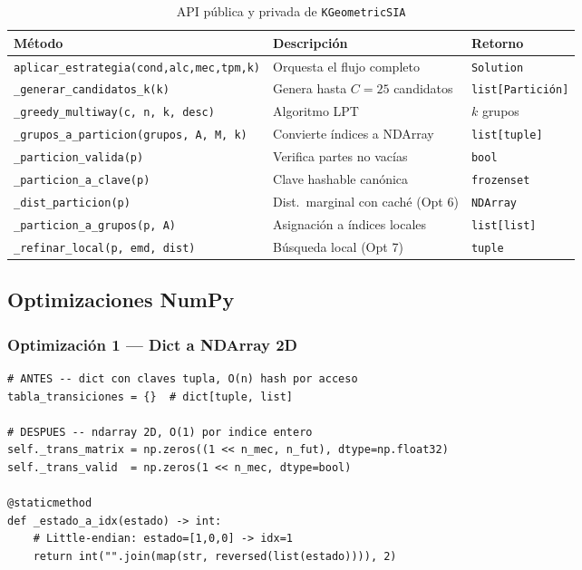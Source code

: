 \documentclass[12pt,letterpaper]{article}
\theoremstyle{definition}
\theoremstyle{remark}
\begin{document}
\begin{table}[ht]
\centering
\caption{API pública y privada de \texttt{KGeometricSIA}}
\label{tab:api-kgeomip}
\begin{tabular}{@{}l p{5.5cm} l@{}}
\toprule
\textbf{Método} & \textbf{Descripción} & \textbf{Retorno} \\
\midrule
\texttt{aplicar\_estrategia(cond,alc,mec,tpm,k)} &
  Orquesta el flujo completo & \texttt{Solution} \\
\texttt{\_generar\_candidatos\_k(k)} &
  Genera hasta $C=25$ candidatos & \texttt{list[Partición]} \\
\texttt{\_greedy\_multiway(c, n, k, desc)} &
  Algoritmo LPT & $k$ grupos \\
\texttt{\_grupos\_a\_particion(grupos, A, M, k)} &
  Convierte índices a NDArray & \texttt{list[tuple]} \\
\texttt{\_particion\_valida(p)} &
  Verifica partes no vacías & \texttt{bool} \\
\texttt{\_particion\_a\_clave(p)} &
  Clave hashable canónica & \texttt{frozenset} \\
\texttt{\_dist\_particion(p)} &
  Dist.\ marginal con caché (Opt 6) & \texttt{NDArray} \\
\texttt{\_particion\_a\_grupos(p, A)} &
  Asignación a índices locales & \texttt{list[list]} \\
\texttt{\_refinar\_local(p, emd, dist)} &
  Búsqueda local (Opt 7) & \texttt{tuple} \\
\bottomrule
\end{tabular}
\end{table}

\subsection{Optimizaciones NumPy}

\subsubsection{Optimización 1 --- Dict a NDArray 2D}

\begin{lstlisting}[style=python,
  caption={Matriz de costos: dict vs NDArray},label=lst:opt1]
# ANTES -- dict con claves tupla, O(n) hash por acceso
tabla_transiciones = {}  # dict[tuple, list]

# DESPUES -- ndarray 2D, O(1) por indice entero
self._trans_matrix = np.zeros((1 << n_mec, n_fut), dtype=np.float32)
self._trans_valid  = np.zeros(1 << n_mec, dtype=bool)

@staticmethod
def _estado_a_idx(estado) -> int:
    # Little-endian: estado=[1,0,0] -> idx=1
    return int("".join(map(str, reversed(list(estado)))), 2)
\end{lstlisting}
\end{document}

